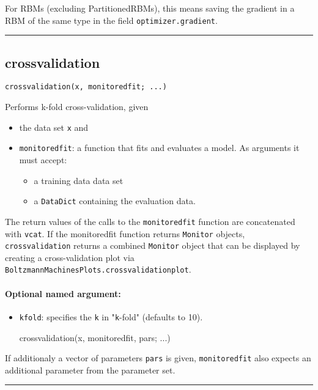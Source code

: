 For RBMs (excluding PartitionedRBMs), this means saving the gradient in a RBM of the same type in the field \texttt{optimizer.gradient}.

\noindent\rule{\textwidth}{1pt}
\subsection*{crossvalidation}
\begin{verbatim}
crossvalidation(x, monitoredfit; ...)
\end{verbatim}
Performs k-fold cross-validation, given

\begin{itemize}
\item the data set \texttt{x} and


\item \texttt{monitoredfit}: a function that fits and evaluates a model. As arguments it must accept:

\begin{itemize}
\item a training data data set


\item a \texttt{DataDict} containing the evaluation data.

\end{itemize}
\end{itemize}
The return values of the calls to the \texttt{monitoredfit} function are concatenated with \texttt{vcat}. If the monitoredfit function returns \texttt{Monitor} objects, \texttt{crossvalidation} returns a combined \texttt{Monitor} object that can be displayed by creating a cross-validation plot via \texttt{BoltzmannMachinesPlots.crossvalidationplot}.

\paragraph*{Optional named argument:}
\begin{itemize}
\item \texttt{kfold}: specifies the \texttt{k} in "\texttt{k}-fold" (defaults to 10).

crossvalidation(x, monitoredfit, pars; ...)

\end{itemize}
If additionaly a vector of parameters \texttt{pars} is given, \texttt{monitoredfit} also expects an additional parameter from the parameter set.

\noindent\rule{\textwidth}{1pt}
